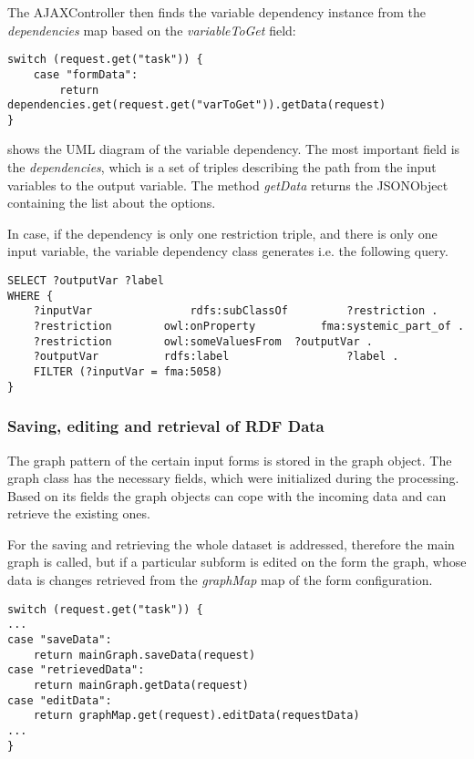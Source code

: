 The AJAXController then finds the variable dependency instance from the \textit{dependencies} map based on the \textit{variableToGet} field:

\begin{lstlisting}[basicstyle=\footnotesize, frame=single, caption={Loading form data from FormConfiguration}, label=serveRequest, captionpos=b, belowskip=1em, aboveskip=1em]
switch (request.get("task")) {
	case "formData": 
		return dependencies.get(request.get("varToGet")).getData(request)		
}
\end{lstlisting}

 shows the UML diagram of the variable dependency. The most important field is the \textit{dependencies}, which is a set of triples describing the path from the input variables to the output variable. The method \textit{getData} returns the JSONObject containing the list about the options.


In case, if the dependency is only one restriction triple, and there is only one input variable, the variable dependency class generates i.e. the following query.

\begin{lstlisting}[basicstyle=\footnotesize, frame=single, caption={SPARQL query generated by class restriction triple}, label=JS_subFormRoutine, captionpos=b, belowskip=1em, aboveskip=2em]
SELECT ?outputVar ?label 
WHERE {
	?inputVar				rdfs:subClassOf			?restriction .
	?restriction		owl:onProperty			fma:systemic_part_of .
	?restriction		owl:someValuesFrom	?outputVar .
	?outputVar			rdfs:label					?label .	
	FILTER (?inputVar = fma:5058)
}
\end{lstlisting}

\newpage
\subsubsection{Saving, editing and retrieval of RDF Data}

The graph pattern of the certain input forms is stored in the graph object. The graph class has the necessary fields, which were initialized during the processing. Based on its fields the graph objects can cope with the incoming data and can retrieve the existing ones.


For the saving and retrieving the whole dataset is addressed, therefore the main graph is called, but if a particular subform is edited on the form the graph, whose data is changes retrieved from the \textit{graphMap} map of the form configuration. 

\begin{lstlisting}[basicstyle=\footnotesize, frame=single, caption={Loading form data from FormConfiguration}, label=serveRequest, captionpos=b, belowskip=1em, aboveskip=2em]
switch (request.get("task")) {
...
case "saveData": 
	return mainGraph.saveData(request)
case "retrievedData": 
	return mainGraph.getData(request)
case "editData": 
	return graphMap.get(request).editData(requestData)
...		
}
\end{lstlisting}
